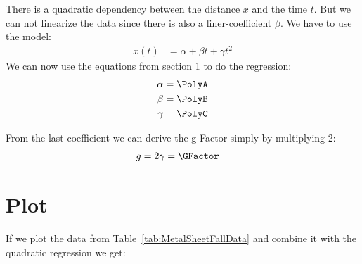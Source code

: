 \documentclass[11pt]{article}
\begin{document}
    
    \pagebreak
    
    
    There is a quadratic dependency between the distance $x$ and the time $t$.
    But we can not linearize the data since there is also a liner-coefficient $\beta$.
    We have to use the model:
    \begin{align*}
        x(t) &= \alpha + \beta t + \gamma t^2
    \end{align*}
    We can now use the equations from section 1 to do the regression:
    \begin{align*}
        \alpha &= \PolyA \\
        \beta &= \PolyB \\
        \gamma &= \PolyC
    \end{align*}
    
    From the last coefficient we can derive the g-Factor simply by multiplying 2:
    \begin{align*}
        g &= 2 \gamma = \GFactor
    \end{align*}
    
    \section{Plot}
    If we plot the data from Table~\ref{tab:MetalSheetFallData} and combine it with the quadratic regression we get:
    
    \figMetalSheetFallGraph
\end{document}
